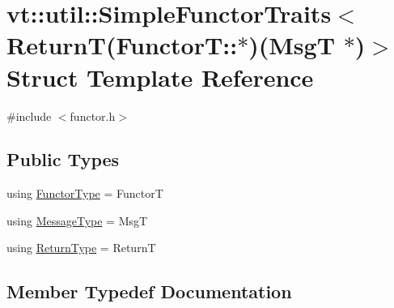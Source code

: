 \hypertarget{structvt_1_1util_1_1_simple_functor_traits_3_01_return_t_07_functor_t_1_1_5_08_07_msg_t_01_5_08_4}{}\section{vt\+:\+:util\+:\+:Simple\+Functor\+Traits$<$ ReturnT(FunctorT\+:\+:$\ast$)(MsgT $\ast$)$>$ Struct Template Reference}
\label{structvt_1_1util_1_1_simple_functor_traits_3_01_return_t_07_functor_t_1_1_5_08_07_msg_t_01_5_08_4}


{\ttfamily \#include $<$functor.\+h$>$}

\subsection*{Public Types}
\begin{DoxyCompactItemize}
\item 
using \hyperlink{structvt_1_1util_1_1_simple_functor_traits_3_01_return_t_07_functor_t_1_1_5_08_07_msg_t_01_5_08_4_a3d122ffa66fef604178b253970bd5fe8}{Functor\+Type} = FunctorT
\item 
using \hyperlink{structvt_1_1util_1_1_simple_functor_traits_3_01_return_t_07_functor_t_1_1_5_08_07_msg_t_01_5_08_4_a8758073f8b3ba9f6b1d336c54ee49d49}{Message\+Type} = MsgT
\item 
using \hyperlink{structvt_1_1util_1_1_simple_functor_traits_3_01_return_t_07_functor_t_1_1_5_08_07_msg_t_01_5_08_4_a6206f7c51b883694c10046d5c92d1469}{Return\+Type} = ReturnT
\end{DoxyCompactItemize}


\subsection{Member Typedef Documentation}
\mbox{\label{structvt_1_1util_1_1_simple_functor_traits_3_01_return_t_07_functor_t_1_1_5_08_07_msg_t_01_5_08_4_a3d122ffa66fef604178b253970bd5fe8}} 
